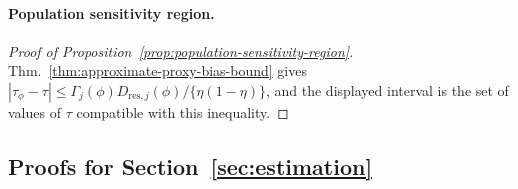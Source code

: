 \paragraph{Population sensitivity region.}
\begin{proof}[Proof of Proposition~\ref{prop:population-sensitivity-region}]
Thm.~\ref{thm:approximate-proxy-bias-bound} gives $|\tau_\phi-\tau|\le\Gamma_j(\phi)D_{\mathrm{res},j}(\phi)/\{\eta(1-\eta)\}$, and the displayed interval is the set of values of $\tau$ compatible with this inequality.
\end{proof}

\subsection{Proofs for Section~\ref{sec:estimation}}

